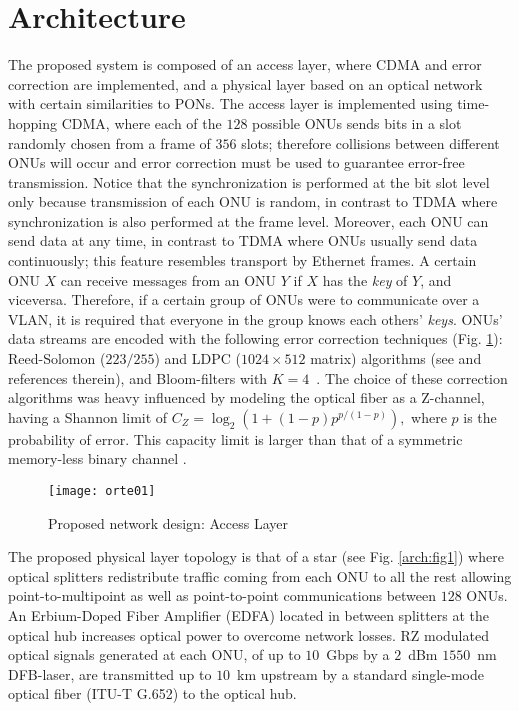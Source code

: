 \documentclass[10pt]{article}
\begin{document}
\section{Architecture}
The proposed system is composed of an access layer, where CDMA and error correction are implemented, and a physical layer based on an optical network with certain similarities to PONs. 
The access layer is implemented using time-hopping CDMA, where each of the $128$ possible ONUs sends bits in a slot randomly chosen from a frame of $356$ slots; therefore
collisions between different ONUs will occur and error correction must be used to guarantee error-free transmission. 
Notice that the synchronization is performed at the bit slot level only
because transmission of each ONU is random, in contrast to TDMA where
synchronization is also performed at the frame level. 
Moreover, each ONU can send data at any time, in contrast to TDMA where
ONUs usually send data continuously; this feature resembles transport by Ethernet frames.
A certain ONU $X$ can receive messages from an ONU $Y$ if $X$ has the
{\em key} of $Y$, and viceversa. Therefore, if a certain group of ONUs
were to communicate over a VLAN, it is required that everyone in the group
knows each others' {\em keys}.
ONUs' data streams are encoded with the following error correction techniques (Fig. \ref{arch:chain}):
 Reed-Solomon ($223/255$) and LDPC ($1024\times512$ matrix) algorithms (see \cite{Moon:05} and references therein), and Bloom-filters with $K=4$~\cite{Bloom70space/timetrade-offs}.
The choice of these correction algorithms was heavy influenced by
modeling the optical fiber as a Z-channel, having a Shannon limit of $ C_{Z} = \log_2\left(1+(1-p) p^{p/(1-p)}\right),$ where $p$ is the probability of error. 
This capacity limit is larger than that of a symmetric memory-less binary channel \cite{Tallini:02}.
\begin{figure}[!t]
  \centering
    \texttt{[image: orte01]}
    \caption{Proposed network design: Access Layer}
    \label{arch:chain}
\end{figure}

The proposed physical layer topology is that of a star (see Fig.
\ref{arch:fig1}) where optical splitters redistribute traffic coming
from each ONU to all the rest allowing point-to-multipoint as well as
point-to-point communications between $128$ ONUs.
An Erbium-Doped Fiber Amplifier (EDFA) located in between splitters at
the optical hub increases optical power to overcome network losses.  RZ
modulated optical signals generated at each ONU, of up to $10$~Gbps by a
$2$~dBm $1550$~nm DFB-laser, are transmitted up to $10$~km upstream by a
standard single-mode optical fiber (ITU-T G.652) to the optical hub.
\end{document}
